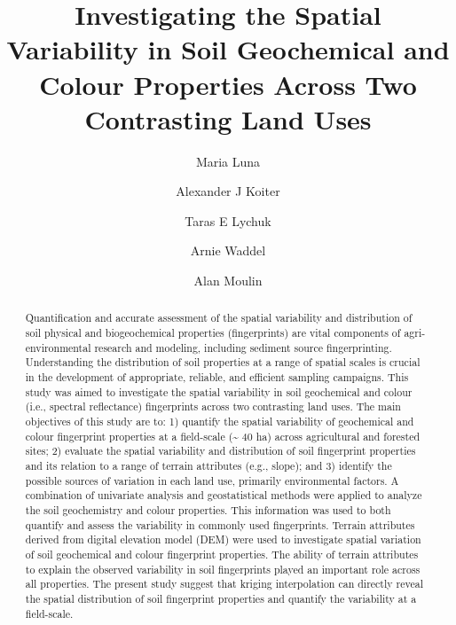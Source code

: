 \documentclass[
  number]{elsarticle}
\begin{document}
\begin{frontmatter}
\title{Investigating the Spatial Variability in Soil Geochemical and
Colour Properties Across Two Contrasting Land Uses}
\author[1]{Maria Luna%
%
}
\author[2]{Alexander J Koiter%
%
}
\author[3]{Taras E Lychuk%
%
}
\author[3]{Arnie Waddel%
%
}
\author[3]{Alan Moulin%
%
}







        
\begin{abstract}
Quantification and accurate assessment of the spatial variability and
distribution of soil physical and biogeochemical properties
(fingerprints) are vital components of agri-environmental research and
modeling, including sediment source fingerprinting. Understanding the
distribution of soil properties at a range of spatial scales is crucial
in the development of appropriate, reliable, and efficient sampling
campaigns. This study was aimed to investigate the spatial variability
in soil geochemical and colour (i.e., spectral reflectance) fingerprints
across two contrasting land uses. The main objectives of this study are
to: 1) quantify the spatial variability of geochemical and colour
fingerprint properties at a field-scale (\textasciitilde{} 40 ha) across
agricultural and forested sites; 2) evaluate the spatial variability and
distribution of soil fingerprint properties and its relation to a range
of terrain attributes (e.g., slope); and 3) identify the possible
sources of variation in each land use, primarily environmental factors.
A combination of univariate analysis and geostatistical methods were
applied to analyze the soil geochemistry and colour properties. This
information was used to both quantify and assess the variability in
commonly used fingerprints. Terrain attributes derived from digital
elevation model (DEM) were used to investigate spatial variation of soil
geochemical and colour fingerprint properties. The ability of terrain
attributes to explain the observed variability in soil fingerprints
played an important role across all properties. The present study
suggest that kriging interpolation can directly reveal the spatial
distribution of soil fingerprint properties and quantify the variability
at a field-scale.
\end{abstract}






\end{frontmatter}
\end{document}
